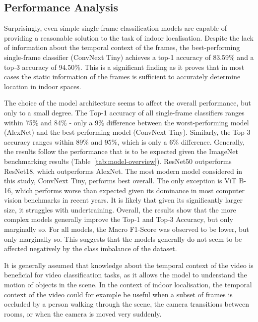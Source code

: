 \documentclass[a4paper]{article}
\begin{document}
\subsection{Performance Analysis} %
\label{sub:performance}

Surprisingly, even simple single-frame classification models are capable of
providing a reasonable solution to the task of indoor localisation. Despite the
lack of information about the temporal context of the frames, the
best-performing single-frame classifier (ConvNext Tiny) achieves a top-1
accuracy of 83.59\% and a top-3 accuracy of 94.50\%. This is a significant
finding as it proves that in most cases the static information of the frames is
sufficient to accurately determine location in indoor spaces.

The choice of the model architecture seems to affect the overall performance,
but only to a small degree. The Top-1 accuracy of all single-frame classifiers
ranges within 75\% and 84\% - only a 9\% difference between the worst-performing
model (AlexNet) and the best-performing model (ConvNext Tiny). Similarly, the
Top-3 accuracy ranges within 89\% and 95\%, which is only a 6\% difference.
Generally, the results follow the performance that is to be expected given the
ImageNet benchmarking results (Table~\ref{tab:model-overview}). ResNet50
outperforms ResNet18, which outperforms AlexNet. The most modern model
considered in this study, ConvNext Tiny, performs best overall. The only
exception is ViT B-16, which performs worse than expected given its dominance in
most computer vision benchmarks in recent years. It is likely that given its
significantly larger size, it struggles with undertraining. Overall, the results
show that the more complex models generally improve the Top-1 and Top-3
Accuracy, but only marginally so. For all models, the Macro F1-Score was
observed to be lower, but only marginally so. This suggests that the models
generally do not seem to be affected negatively by the class imbalance of the
dataset.

It is generally assumed that knowledge about the temporal context of the video
is beneficial for video classification tasks, as it allows the model to
understand the motion of objects in the scene. In the context of indoor
localisation, the temporal context of the video could for example be useful when
a subset of frames is occluded by a person walking through the scene, the camera
transitions between rooms, or when the camera is moved very suddenly.
\end{document}
